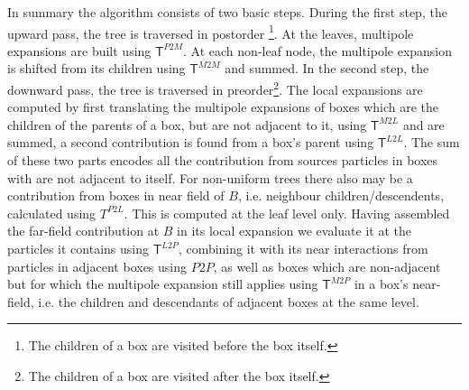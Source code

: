 In summary the algorithm consists of two basic steps. During the first step, the upward pass, the tree is traversed in postorder \footnote{The children of a box are visited before the box itself.}. At the leaves, multipole expansions are built using $\mathsf{T}^{P2M}$. At each non-leaf node, the multipole expansion is shifted from its children using $\mathsf{T}^{M2M}$ and summed. In the second step, the downward pass, the tree is traversed in preorder\footnote{The children of a box are visited after the box itself.}. The local expansions are computed by first translating the multipole expansions of boxes which are the children of the parents of a box, but are not adjacent to it, using $\mathsf{T}^{M2L}$ and are summed, a second contribution is found from a box's parent using $\mathsf{T}^{L2L}$. The sum of these two parts encodes all the contribution from sources particles in boxes with are not adjacent to itself. For non-uniform trees there also may be a contribution from boxes in near field of $B$, i.e. neighbour children/descendents, calculated using $T^{P2L}$. This is computed at the leaf level only. Having assembled the far-field contribution at $B$ in its local expansion we evaluate it at the particles it contains using $\mathsf{T}^{L2P}$, combining it with its near interactions from particles in adjacent boxes using $P2P$, as well as boxes which are non-adjacent but for which the multipole expansion still applies using $\mathsf{T}^{M2P}$ in a box's near-field, i.e. the children and descendants of adjacent boxes at the same level.


